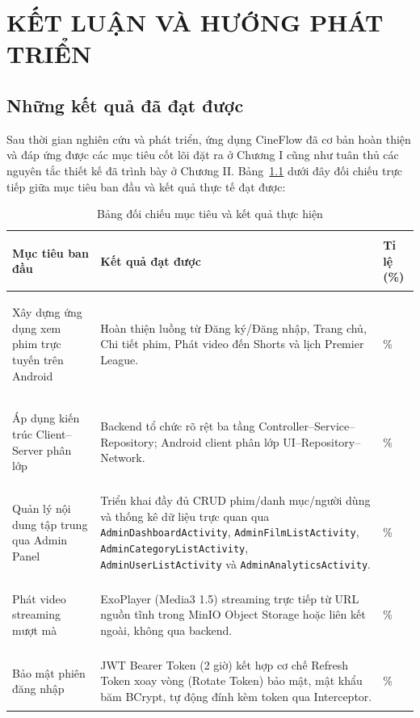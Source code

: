 \chapter{KẾT LUẬN VÀ HƯỚNG PHÁT TRIỂN}
\label{chap:ket_luan}

\section{Những kết quả đã đạt được}
\label{sec:ket_qua_dat_duoc}

Sau thời gian nghiên cứu và phát triển, ứng dụng CineFlow đã cơ bản hoàn thiện và đáp ứng được các mục tiêu cốt lõi đặt ra ở Chương I cũng như tuân thủ các nguyên tắc thiết kế đã trình bày ở Chương II. Bảng~\ref{tab:ket_qua_doi_chieu} dưới đây đối chiếu trực tiếp giữa mục tiêu ban đầu và kết quả thực tế đạt được:

\begin{table}[H]
    \centering
    \renewcommand{\arraystretch}{1.5}
    \caption{Bảng đối chiếu mục tiêu và kết quả thực hiện}
    \label{tab:ket_qua_doi_chieu}
    \begin{tabularx}{\textwidth}{|>{\bfseries\raggedright\arraybackslash}p{4cm}|X|>{\centering\arraybackslash}p{2cm}|}
        \hline
        \rowcolor{gray!30} \textbf{Mục tiêu ban đầu} & \textbf{Kết quả đạt được} & \textbf{Tỉ lệ (\%)} \\ \hline
        Xây dựng ứng dụng xem phim trực tuyến trên Android & Hoàn thiện luồng từ Đăng ký/Đăng nhập, Trang chủ, Chi tiết phim, Phát video đến Shorts và lịch Premier League. & 100\% \\ \hline
        Áp dụng kiến trúc Client--Server phân lớp & Backend tổ chức rõ rệt ba tầng Controller--Service--Repository; Android client phân lớp UI--Repository--Network. & 100\% \\ \hline
        Quản lý nội dung tập trung qua Admin Panel & Triển khai đầy đủ CRUD phim/danh mục/người dùng và thống kê dữ liệu trực quan qua \texttt{AdminDashboardActivity}, \texttt{AdminFilmListActivity}, \texttt{AdminCategoryListActivity}, \texttt{AdminUserListActivity} và \texttt{AdminAnalyticsActivity}. & 100\% \\ \hline
        Phát video streaming mượt mà & ExoPlayer (Media3 1.5) streaming trực tiếp từ URL nguồn tĩnh trong MinIO Object Storage hoặc liên kết ngoài, không qua backend. & 100\% \\ \hline
        Bảo mật phiên đăng nhập & JWT Bearer Token (2 giờ) kết hợp cơ chế Refresh Token xoay vòng (Rotate Token) bảo mật, mật khẩu băm BCrypt, tự động đính kèm token qua Interceptor. & 100\% \\ \hline
    \end{tabularx}
\end{table}

